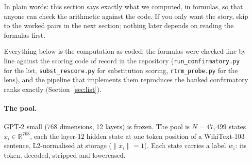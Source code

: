 \documentclass[11pt]{article}
\begin{document}
In plain words: this section says exactly what we computed, in
formulas, so that anyone can check the arithmetic against the code.
If you only want the story, skip to the worked pairs in the next
section; nothing later depends on reading the formulas first.


Everything below is the computation as coded; the formulas were
checked line by line against the scoring code of record in the
repository (\texttt{run\_confirmatory.py} for the list,
\texttt{subst\_rescore.py} for substitution scoring,
\texttt{rtrm\_probe.py} for the lens), and the pipeline that
implements them reproduces the banked confirmatory ranks exactly
(Section~\ref{sec:list}).

\paragraph{The pool.} GPT-2 small (768 dimensions, 12 layers) is
frozen. The pool is $N = 47{,}499$ states $x_i \in \mathbb{R}^{768}$,
each the layer-12 hidden state at one token position of a
WikiText-103 sentence, L2-normalised at storage
($\lVert x_i \rVert = 1$). Each state carries a label $w_i$: its
token, decoded, stripped and lowercased.
\end{document}
